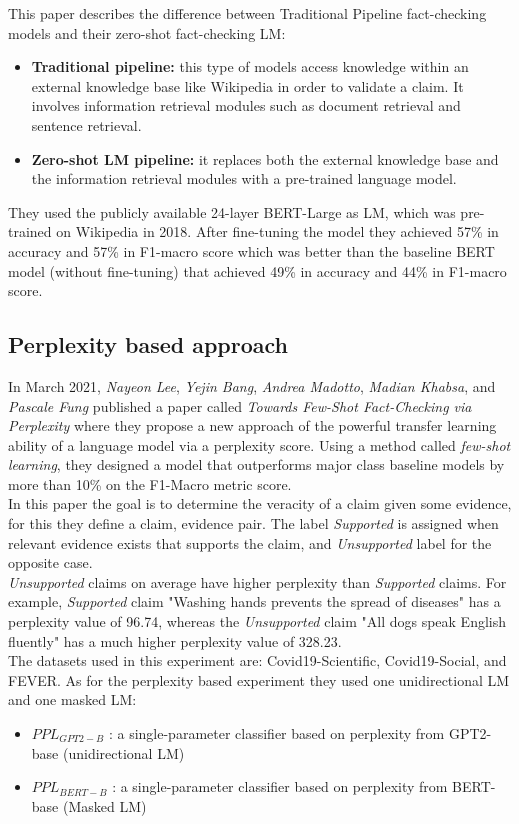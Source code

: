 \documentclass[conference]{IEEEtran}
\begin{document}
This paper describes the difference between Traditional Pipeline fact-checking models and their zero-shot fact-checking LM:

\begin{itemize}
\item \textbf{Traditional pipeline:} this type of models access knowledge within an external knowledge base like Wikipedia in order to validate a claim. It involves information retrieval modules such as document retrieval and sentence retrieval.
\item \textbf{Zero-shot LM pipeline:} it replaces both the external knowledge base and the information retrieval modules with a pre-trained language model.\\
\end{itemize}

They used the publicly available 24-layer BERT-Large as LM, which was pre-trained on Wikipedia in 2018. After fine-tuning the model they achieved 57\% in accuracy and 57\% in F1-macro score which was better than the baseline BERT model (without fine-tuning) that achieved 49\% in accuracy and 44\% in F1-macro score.

\subsection{Perplexity based approach \cite{lee2021towards} \cite{lee2020misinformation}}
In March 2021, \textit{Nayeon Lee}, \textit{Yejin Bang}, \textit{Andrea Madotto}, \textit{Madian Khabsa}, and \textit{Pascale Fung} published a paper called \textit{Towards Few-Shot Fact-Checking via Perplexity} where they propose a new approach of the powerful transfer learning ability of a language model via a perplexity score. Using a method called \textit{few-shot learning}, they designed a model that outperforms major class baseline models by more than 10\% on the F1-Macro metric score.\\
In this paper the goal is to determine the veracity of a claim given some evidence, for this they define a {claim, evidence} pair. The label \emph{Supported} is assigned when relevant evidence exists that supports the claim, and \emph{Unsupported} label for the opposite case.\\
\emph{Unsupported} claims on average have higher perplexity than \emph{Supported} claims. For example, \emph{Supported} claim "Washing hands prevents the spread of diseases" has a perplexity value of 96.74, whereas the \emph{Unsupported} claim "All dogs speak English fluently" has a much higher perplexity value of 328.23.\\
The datasets used in this experiment are: Covid19-Scientific, Covid19-Social, and FEVER. As for the perplexity based experiment they used one unidirectional LM and one masked LM:
\begin{itemize}
\item $PPL_{GPT2-B}$ : a single-parameter classifier based on perplexity from GPT2-base \cite{radford2019language} (unidirectional LM)
\item $PPL_{BERT-B}$ : a single-parameter classifier based on perplexity from BERT-base \cite{devlin2018bert} (Masked LM)\\
\end{itemize}
\end{document}
